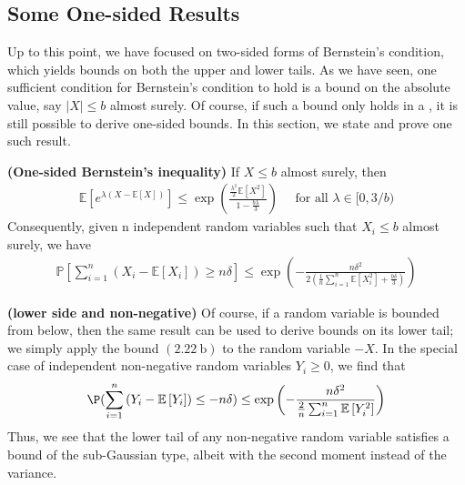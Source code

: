 \documentclass{article}
\newcommand{\bfs}[1]{\textbf{({#1})}}
\begin{document}
\subsection{Some One-sided Results}\label{ssec:oneside}
Up to this point, we have focused on two-sided forms of Bernstein's condition, which yields bounds on both the upper and lower tails. As we have seen, one sufficient condition for Bernstein's condition to hold is a bound on the absolute value, say $|X| \leq b$ almost surely. Of course, if such a bound only holds in a , it is still possible to derive one-sided bounds. In this section, we state and prove one such result.

\begin{thma}{\bfs{One-sided Bernstein's inequality}}
If $X \leq b$ almost surely, then
\begin{align}
   \mathbb{E}\left[e^{\lambda(X-\mathbb{E}[X])}\right] \leq \exp \left(\frac{\frac{\lambda^{2}}{2} \mathbb{E}\left[X^{2}\right]}{1-\frac{b \lambda}{3}}\right) \quad \text { for all } \lambda \in[0,3 / b) \label{eq:onesidea}
\end{align}
Consequently, given n independent random variables such that $X_{i} \leq b$ almost surely, we have 
\begin{align}
   \mathbb{P}\left[\sum_{i=1}^{n}\left(X_{i}-\mathbb{E}\left[X_{i}\right]\right) \geq n \delta\right] \leq \exp \left(-\frac{n \delta^{2}}{2\left(\frac{1}{n} \sum_{i=1}^{n} \mathbb{E}\left[X_{i}^{2}\right]+\frac{b \delta}{3}\right)}\right) \label{eq:onesideb}
\end{align}

\end{thma} 
\begin{rema}{\bfs{lower side and non-negative}}
Of course, if a random variable is bounded from below, then the same result can be used
to derive bounds on its lower tail; we simply apply the bound $(2.22 \mathrm{~b})$ to the random variable $-X .$ In the special case of independent non-negative random variables $Y_{i} \geq 0$, we find that
$$
\P(\sum_{i=1}^{n}\left(Y_{i}-\mathbb{E}\left[Y_{i}\right]\right) \leq-n \delta) \leq \exp \left(-\frac{n \delta^{2}}{\frac{2}{n} \sum_{i=1}^{n} \mathbb{E}\left[Y_{i}^{2}\right]}\right)
$$
Thus, we see that the lower tail of any non-negative random variable satisfies a bound of the sub-Gaussian type, albeit with the second moment instead of the variance.
\end{rema}
\end{document}
